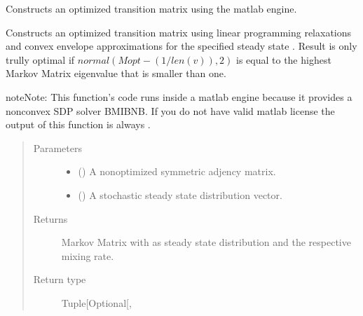 \documentclass[letterpaper,10pt,english]{sphinxmanual}
\begin{document}
\begin{fulllineitems}
\label{\detokenize{app.domain.helpers:app.domain.helpers.matrices.new_mgo_transition_matrix}}
Constructs an optimized transition matrix using the matlab engine.

Constructs an optimized transition matrix using linear programming
relaxations and convex envelope approximations for the specified steady
state .
Result is only trully optimal if \(normal(Mopt - (1 / len(v)), 2)\)
is equal to the highest Markov Matrix eigenvalue that is smaller than one.

\begin{sphinxadmonition}{note}{Note:}
This function’s code runs inside a matlab engine because it provides
a non\sphinxhyphen{}convex SDP solver BMIBNB. If you do not have valid matlab
license the output of this function is always .
\end{sphinxadmonition}
\begin{quote}\begin{description}
\item[{Parameters}] \leavevmode\begin{itemize}
\item {} 
 () \textendash{} A non\sphinxhyphen{}optimized symmetric adjency matrix.

\item {} 
 () \textendash{} A stochastic steady state distribution vector.

\end{itemize}

\item[{Returns}] \leavevmode
Markov Matrix with  as steady state distribution and the
respective mixing rate.

\item[{Return type}] \leavevmode
Tuple{[}Optional{[}\sphinxhref{https://numpy.org/doc/stable/reference/generated/numpy.ndarray.html\#numpy.ndarray}{numpy.ndarray}{]}, \sphinxhref{https://docs.python.org/3.7/library/functions.html\#float}{float}{]}

\end{description}\end{quote}

\end{fulllineitems}
\end{document}
